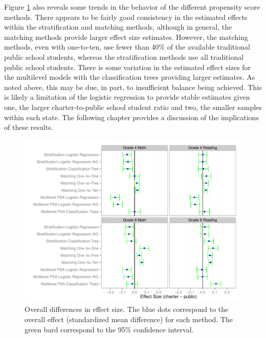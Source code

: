 \documentclass[letterpaper,12p,twoside]{article} %
\begin{document}
Figure \ref{fig:overalldiff} also reveals some trends in the behavior of the different propensity score methods. There appears to be fairly good consistency in the estimated effects within the stratification and matching methods, although in general, the matching methods provide larger effect size estimates. However, the matching methods, even with one-to-ten, use fewer than 40\% of the available traditional public school students, whereas the stratification methods use all traditional public school students. There is some variation in the estimated effect sizes for the multilevel models with the classification trees providing larger estimates. As noted above, this may be due, in part, to insufficient balance being achieved. This is likely a limitation of the logistic regression to provide stable estimates given one, the larger charter-to-public school student ratio and two, the smaller samples within each state. The following chapter provides a discussion of the implications of these results.

\setlength{\belowcaptionskip}{-10pt}
\begin{figure}[t]
\begin{center}
\includegraphics[width=\textwidth]{../Figures2009/Overall.pdf}
\caption[Overall differences in effect size]{Overall differences in effect size. The blue dots correspond to the overall effect (standardized mean difference) for each method. The green bard correspond to the 95\% confidence interval.}
\label{fig:overalldiff}
\end{center}
\end{figure}
\setlength{\belowcaptionskip}{0pt}
\end{document}
